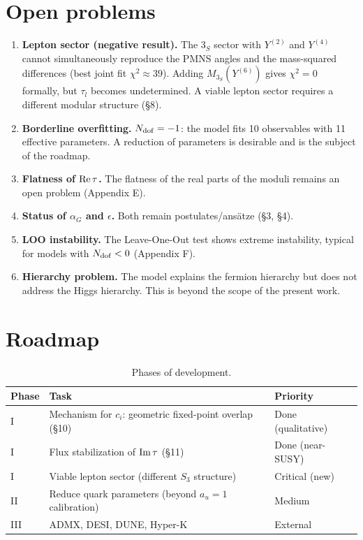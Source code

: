 \documentclass[12pt,a4paper]{article}
\numberwithin{equation}{section}
\begin{document}
\section{Open problems}
\begin{enumerate}[leftmargin=1.5em]
\item \textbf{Lepton sector (negative result).} The \(3_S\) sector with \(Y^{(2)}\) and \(Y^{(4)}\) cannot simultaneously reproduce the PMNS angles and the mass-squared differences (best joint fit \(\chi^2 \approx 39\)). Adding \(M_{3_S}(Y^{(6)})\) gives \(\chi^2 = 0\) formally, but \(\tau_l\) becomes undetermined. A viable lepton sector requires a different modular structure (\S8).
\item \textbf{Borderline overfitting.} \(N_{\rm dof} = -1\): the model fits 10 observables with 11 effective parameters. A reduction of parameters is desirable and is the subject of the roadmap.
\item \textbf{Flatness of \({\rm Re}\,\tau\).} The flatness of the real parts of the moduli remains an open problem (Appendix E).
\item \textbf{Status of \(\alpha_G\) and \(\epsilon\).} Both remain postulates/ansätze (\S3, \S4).
\item \textbf{LOO instability.} The Leave-One-Out test shows extreme instability, typical for models with \(N_{\rm dof} < 0\) (Appendix F).
\item \textbf{Hierarchy problem.} The model explains the fermion hierarchy but does not address the Higgs hierarchy. This is beyond the scope of the present work.
\end{enumerate}

\section{Roadmap}
\begin{table}[H]
\centering
\caption{Phases of development.}
\begin{tabular}{lll}
\toprule
Phase & Task & Priority \\
\midrule
I & Mechanism for \(c_i\): geometric fixed-point overlap (\S10) & Done (qualitative) \\
I & Flux stabilization of \({\rm Im}\,\tau\) (\S11) & Done (near-SUSY) \\
I & Viable lepton sector (different \(S_3\) structure) & Critical (new) \\
II & Reduce quark parameters (beyond \(a_u=1\) calibration) & Medium \\
III & ADMX, DESI, DUNE, Hyper-K & External \\
\bottomrule
\end{tabular}
\end{table}
\end{document}
